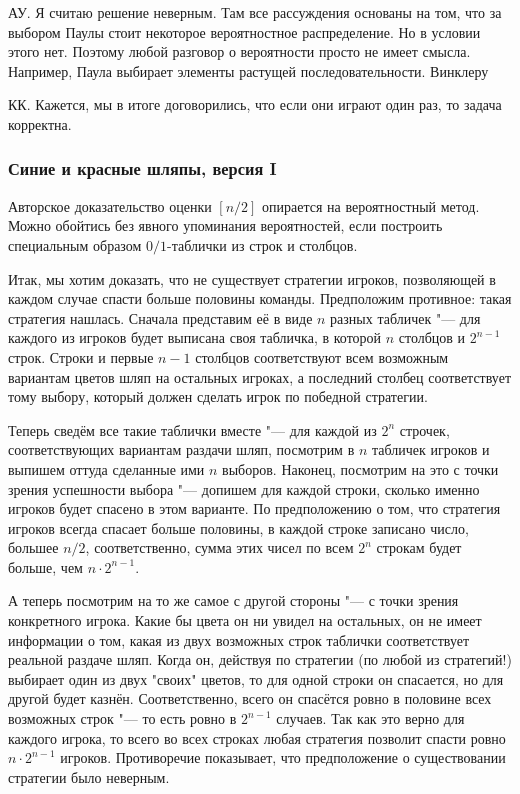\documentclass[twoside]{book}
\begin{document}
АУ. Я считаю решение неверным. Там все рассуждения основаны на том, 
что за выбором Паулы стоит некоторое вероятностное распределение. Но в условии этого нет. Поэтому любой разговор 
о вероятности просто не имеет смысла. Например, Паула выбирает элементы растущей последовательности. Винклеру 

КК. Кажется, мы в итоге договорились, что если они играют один раз, то задача корректна.


\subsubsection{Синие и красные шляпы, версия I}
Авторское доказательство оценки $[n/2]$ опирается на вероятностный метод. 
Можно обойтись без явного упоминания вероятностей, если построить специальным образом $0/1$-таблички из строк и столбцов.

Итак, мы хотим доказать, что не существует стратегии игроков, позволяющей в каждом случае спасти больше половины команды.
Предположим противное: такая стратегия нашлась.
Сначала представим её в виде $n$ разных табличек "--- для каждого из игроков
будет выписана своя табличка, в которой $n$ столбцов и $2^{n-1}$ строк. Строки и первые $n-1$ столбцов соответствуют всем
возможным вариантам цветов шляп на остальных игроках, а последний столбец соответствует тому выбору, который
должен сделать игрок по победной стратегии. 

Теперь сведём все такие таблички вместе "--- для каждой из $2^n$ строчек, соответствующих вариантам раздачи шляп,
посмотрим в $n$ табличек игроков и выпишем оттуда сделанные ими $n$ выборов. Наконец, посмотрим на это
с точки зрения успешности выбора "--- допишем для каждой строки, сколько именно игроков будет спасено в этом варианте.
По предположению о том, что стратегия игроков всегда спасает больше половины, в каждой строке записано число, большее $n/2$,
соответственно, сумма этих чисел по всем $2^n$ строкам будет больше, чем $n\cdot 2^{n-1}$.

А теперь посмотрим на то же самое с другой стороны "--- с точки зрения конкретного игрока.
Какие бы цвета он ни увидел на остальных, он не имеет информации о том, какая из двух возможных строк таблички соответствует
реальной раздаче шляп. Когда он, действуя по стратегии (по любой из стратегий!) выбирает один из двух "своих" цветов, 
то для одной строки он спасается, но для другой будет казнён. Соответственно, всего он спасётся ровно в половине всех 
возможных строк "--- то есть ровно в $2^{n-1}$ случаев. Так как это верно для каждого игрока, то всего во всех строках 
любая стратегия позволит спасти ровно $n \cdot 2^{n-1}$ игроков. Противоречие показывает, что предположение
о существовании стратегии было неверным.
\end{document}
